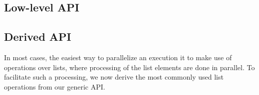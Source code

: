 \documentclass[tfpsymp,pagenumbers]{tfp07symp}
\newcommand{\Ocaml}{OCaml}
\begin{document}
\begin{comment}
When master and worker programs are compiled with different
versions of the \Ocaml\ compiler, our library still provides
a monomorphic API over strings. As a consequence, we need to convert
integers to and from strings in both master and worker.
The modified worker program is as follows:
\begin{ocaml}
  open Mono
  let worker i = ...
  let worker_string i = string_of_int (worker (int_of_string i))
  let () = Worker.compute worker_string ()
\end{ocaml}
The master program is modified in a similar way.
We simply replace \of{Poly} with \of{Mono} and encode/decode integers
as strings, as follows:
\begin{ocaml}
  let tasks = 
    let l = ref [] in 
    for i = 0 to n do l := (string_of_int i, ()) :: !l done; 
    !l
  let master (i,()) fi = s := !s + int_of_string fi; []
\end{ocaml}
\end{comment}

\subsection{Low-level API}


\subsection{Derived API}\label{sec:derived}

In most cases, the easiest way to parallelize an execution it to make
use of operations over lists, where processing of the
list elements are done in parallel. 
To facilitate such a processing,
we now derive the most commonly used list operations from our generic
API.
\end{document}
